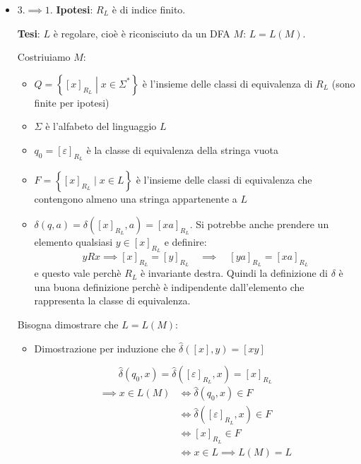 \documentclass[a4paper]{article}
\begin{document}
\begin{theorem}
\begin{itemize}
    \item \( 3. \implies 1. \)
      \textbf{Ipotesi}: \( R_L \) è di indice finito.

      \textbf{Tesi}: \( L \) è regolare, cioè è riconisciuto da un DFA \( M \): \( L = L(M) \).

      \vspace{1em}
      \noindent
      Costriuiamo \( M \):
      \begin{itemize}
        \item \( Q = \left\{ [x]_{R_L} \;\left|\; x \in \Sigma^* \right. \right\} \) 
          è l'insieme delle classi di equivalenza di \( R_L \) (sono finite per ipotesi)

        \item \( \Sigma \) è l'alfabeto del linguaggio \( L \)

        \item \( q_0 = [\varepsilon]_{R_L} \) è la classe di equivalenza della stringa vuota

        \item \( F = \left\{ [x]_{R_L} \;\left|\; x \in L \right. \right\} \) è l'insieme
          delle classi di equivalenza che contengono almeno una stringa appartenente a \( L \)

        \item \( \delta(q, a) = \delta\left( [x]_{R_L}, a \right) = [xa]_{R_L} \). Si
          potrebbe anche prendere un elemento qualsiasi \( y \in [x]_{R_L} \) e definire:
          \[
            yRx \implies [x]_{R_L} = [y]_{R_L} \quad \implies \quad [ya]_{R_L} = [xa]_{R_L}
          \] 
          e questo vale perchè \( R_L \) è invariante destra. Quindi la definizione
          di \( \delta \) è una buona definizione perchè è indipendente dall'elemento
          che rappresenta la classe di equivalenza.
      \end{itemize}
      Bisogna dimostrare che \( L = L(M) \):
      \begin{itemize}
        \item Dimostrazione per induzione che \( \hat{\delta}([x],y) = [xy] \) 

          \vspace{1em}
          \noindent
          \[
            \hat{\delta}(q_0, x) = \hat{\delta}([\varepsilon]_{R_L}, x) = [x]_{R_L}
          \] 
          \[
            \begin{aligned}
              \implies x \in L(M) &\iff \hat{\delta}(q_0, x) \in F\\
                                  &\iff \hat{\delta}([\varepsilon]_{R_L}, x) \in F\\
                                  &\iff [x]_{R_L} \in F\\
                                  &\iff x \in L \implies L(M) = L
            \end{aligned}
          \] 


\end{itemize}
\end{itemize}
\end{theorem}
\end{document}
